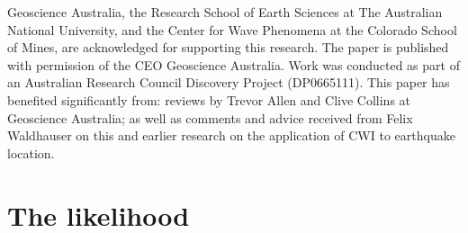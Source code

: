 \documentclass[extra, onecolumn, doublespacing]{gji}
\begin{document}
\begin{acknowledgments}
Geoscience Australia, the Research School of Earth Sciences at The
Australian National University, and the Center for Wave Phenomena at
the Colorado School of Mines, are acknowledged for supporting this
research. The paper is published with permission of the CEO
Geoscience Australia. Work was conducted as part of an Australian
Research Council Discovery Project (DP0665111).  This paper has
benefited significantly from: reviews by Trevor Allen and Clive Collins
at Geoscience Australia; as well as comments and advice received from
Felix Waldhauser on this and earlier research on the application of
CWI to earthquake location.
\end{acknowledgments}







\appendix

\section{The likelihood}
\label{sec-Appendix-noisylikelihood}
\end{document}
